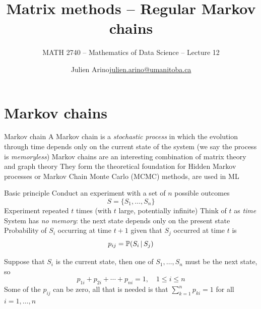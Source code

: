 \documentclass[aspectratio=169]{beamer}\usepackage[]{graphicx}\usepackage[]{xcolor}
\subtitle{MATH 2740 -- Mathematics of Data Science -- Lecture 12}
\author{\texorpdfstring{Julien Arino\newline\url{julien.arino@umanitoba.ca}}{Julien Arino}}
\institute{Department of Mathematics @ University of Manitoba}
\title{Matrix methods -- Regular Markov chains}
\begin{document}
\setcounter{theorem}{89}



\section{Markov chains}

\begin{frame}{Markov chain}
	A Markov chain is a \emph{stochastic process} in which the evolution through time depends only on the current state of the system (we say the process is \emph{memoryless})
	\vfill
	Markov chains are an interesting combination of matrix theory and graph theory
	\vfill
	They form the theoretical foundation for Hidden Markov processes or Markov Chain Monte Carlo (MCMC) methods, are used in ML
\end{frame}



\begin{frame}{Basic principle}
Conduct an experiment with a set of $n$ possible outcomes
\[
S=\{S_1,\dots, S_n\}
\]
\vfill
Experiment repeated $t$ times (with $t$ large, potentially infinite)
\vfill
Think of $t$ as \emph{time}
\vfill 
System has \emph{no memory}: the next state depends only on the present state
\vfill
Probability of $S_i$ occurring at time $t+1$ given that $S_j$ occurred at time $t$ is
\[
p_{ij}=\mathbb{P}(S_i\,|\,S_j)
\]
\end{frame}


\begin{frame} 
Suppose that $S_i$ is the current state, then one of $S_1, \ldots,S_n$ must be the next state, so
\[
p_{1i}+p_{2i}+\cdots+p_{ni}=1, \quad 1\leq i\leq n
\]
\vfill
Some of the $p_{ij}$ can be zero, all that is needed is that $\sum_{k=1}^n p_{ki}=1$ for all $i=1,\ldots,n$
\end{frame}
\end{document}
